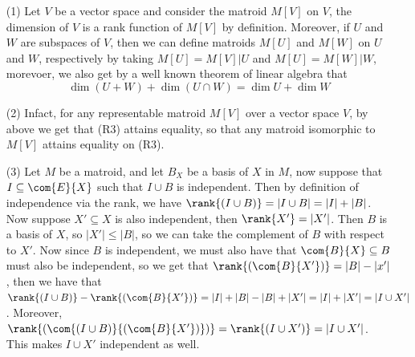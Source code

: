 \begin{example}\label{1.11}
    \begin{enumerate}
        \item[(1)] Let $V$ be a vector space and consider the matroid $M[V]$ on
            $V$, the dimension of $V$ is a rank function of $M[V]$ by definition.
            Moreover, if $U$ and  $W$ are subspaces of  $V$, then we can define
            matroids  $M[U]$ and $M[W]$ on $U$ and  $W$, respectively by taking
            $M[U]=M[V]|U$ and $M[U]=M[W]|W$, morevoer, we also get by a well
            known theorem of linear algebra that
                \begin{equation*}
                    \dim{(U+W)}+\dim{(U \cap W)}=\dim{U}+\dim{W}
                \end{equation*}

            \item[(2)] Infact, for any representable matroid $M[V]$ over a
                vector space $V$, by above we get that (R3) attains equality, so
                that any matroid isomorphic to $M[V]$ attains equality on (R3).

            \item[(3)] Let $M$ be a matroid, and let  $B_X$ be a basis of $X$ in
                $M$, now suppose that  $I \subseteq \com{E}{X}$ such that
                $I \cup B$ is independent. Then by definition of independence
                via the rank, we have $\rank{(I \cup B)}=|I \cup B|=|I|+|B|$.
                Now suppose $X' \subseteq X$ is also independent, then
                $\rank{X'}=|X'|$. Then $B$ is a basis of  $X$, so  $|X'| \leq
                |B|$, so we can take the complement of  $B$ with respect to
                $X'$. Now since $B$ is independent, we must also have that
                $\com{B}{X} \subseteq B$ must also be independent, so we get that
                $\rank{(\com{B}{X'})}=|B|-|x'|$, then we have that
                $\rank{(I \cup B)}-\rank{(\com{B}{X'})}=|I|+|B|-|B|+|X'|=|I|+|X'|
                =|I \cup X'|$. Moreover, $\rank{(\com{(I \cup
                B)}{(\com{B}{X'})})}=\rank{(I \cup X')}=|I \cup X'|$. This makes
                $I \cup X'$ independent as well.

    \end{enumerate}
\end{example}

